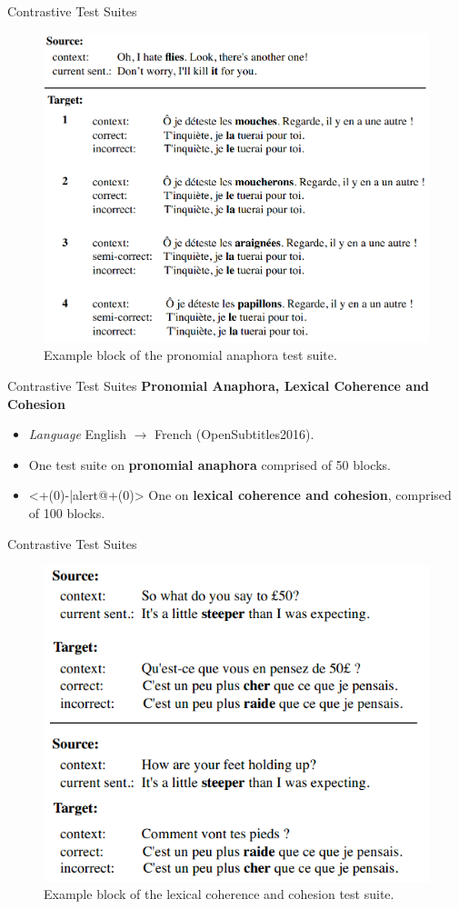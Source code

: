 \begin{frame}{Contrastive Test Suites}
	\begin{figure}
		\centering
		\includegraphics[width=0.59\linewidth]{Images/anaphora_test_suite}
		\caption{Example block of the pronomial anaphora test suite.}
		\label{fig:anaphoratestsuite}
	\end{figure}
\end{frame}

\begin{frame}{Contrastive Test Suites}
	\textbf{Pronomial Anaphora, Lexical Coherence and Cohesion} \cite{bawden_evaluating_2018}
	\begin{itemize}
		\item \textit{Language} English $\rightarrow$ French (OpenSubtitles2016).
		\item One test suite on \textbf{pronomial anaphora} comprised of 50 blocks.
		\item<+(0)-|alert@+(0)> One on \textbf{lexical coherence and cohesion}, comprised of 100 blocks.
	\end{itemize}
\end{frame}


\begin{frame}{Contrastive Test Suites}
	\begin{figure}
		\centering
		\includegraphics[width=0.57\linewidth]{Images/coherence_test_suite}
		\caption{Example block of the lexical coherence and cohesion test suite.}
		\label{fig:coherencetestsuite}
	\end{figure}
\end{frame}


